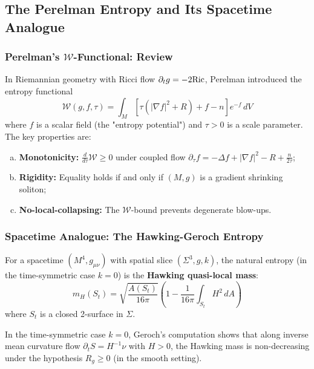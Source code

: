 \subsection{The Perelman Entropy and Its Spacetime Analogue}

\subsubsection{Perelman's $\mathcal{W}$-Functional: Review}

In Riemannian geometry with Ricci flow $\partial_t g = -2\mathrm{Ric}$, Perelman introduced the entropy functional
\begin{equation}
\mathcal{W}(g, f, \tau) = \int_M \left[\tau\left(|\nabla f|^2 + R\right) + f - n\right]e^{-f} \, dV
\label{eq:perelman-W}
\end{equation}
where $f$ is a scalar field (the "entropy potential") and $\tau > 0$ is a scale parameter. The key properties are:
\begin{enumerate}[(a)]
\item \textbf{Monotonicity:} $\frac{d}{d\tau}\mathcal{W} \geq 0$ under coupled flow $\partial_\tau f = -\Delta f + |\nabla f|^2 - R + \frac{n}{2\tau}$;
\item \textbf{Rigidity:} Equality holds if and only if $(M,g)$ is a gradient shrinking soliton;
\item \textbf{No-local-collapsing:} The $\mathcal{W}$-bound prevents degenerate blow-ups.
\end{enumerate}

\subsubsection{Spacetime Analogue: The Hawking-Geroch Entropy}

For a spacetime $(M^4, g_{\mu\nu})$ with spatial slice $(\Sigma^3, g, k)$, the natural entropy (in the time-symmetric case $k=0$) is the \textbf{Hawking quasi-local mass}:
\begin{equation}
m_H(S_t) 
= \sqrt{\frac{A(S_t)}{16\pi}}\left(1 - \frac{1}{16\pi}\int_{S_t} H^2 \, dA\right)
\label{eq:hawking-mass}
\end{equation}
where $S_t$ is a closed 2-surface in $\Sigma$.

\begin{proposition}
\label{prop:hawking-imcf}
In the time-symmetric case $k=0$, Geroch's computation shows that along inverse mean curvature flow $\partial_t S = H^{-1}\nu$ with $H>0$, the Hawking mass is non-decreasing under the hypothesis $R_g\ge 0$ (in the smooth setting).
\end{proposition}

